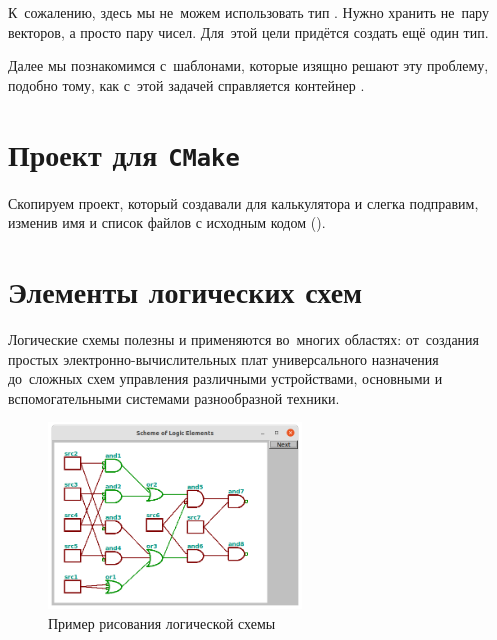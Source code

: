 
К~сожалению, здесь мы не~можем использовать тип . Нужно хранить не~пару векторов, а просто пару чисел. Для~этой цели придётся создать ещё один тип.


Далее мы познакомимся с~шаблонами, которые изящно решают эту проблему, подобно тому, как с~этой задачей справляется контейнер .



\section{Проект для \texttt{CMake}}
Скопируем проект, который создавали для калькулятора и слегка подправим, изменив имя и список файлов с исходным кодом ().




\section{Элементы логических схем}
Логические схемы полезны и применяются во~многих областях: от~создания простых электронно-вычислительных плат универсального назначения до~сложных схем управления различными устройствами, основными и вспомогательными системами разнообразной техники.

\begin{figure}[h]
    {\centering
        \includegraphics[width=0.6\textwidth]{images/logic_elements.png}

    }
    \caption{Пример рисования логической схемы}
    \label{fig:logicelems}
\end{figure}



